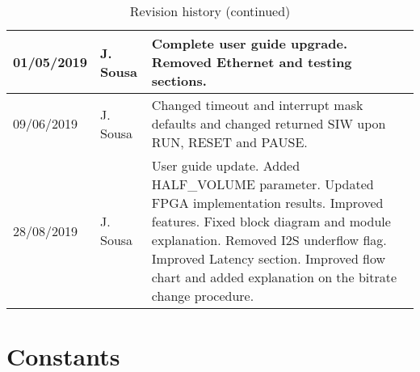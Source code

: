 \documentclass{ug}
\theoremstyle{plain}
\begin{document}
\begin{table}[H]
\begin{center}
\begin{tabular}{|l|l|p{8cm}|}
     01/05/2019 & J. Sousa & Complete user guide upgrade. Removed Ethernet and
     testing sections.\\ \hline

     \rowcolor{iob-blue} 09/06/2019 & J. Sousa & Changed timeout and interrupt
     mask defaults and changed returned SIW upon RUN, RESET and PAUSE.\\ \hline

     28/08/2019 & J. Sousa & User guide update. Added HALF\_VOLUME
     parameter. Updated FPGA implementation results. Improved features. Fixed
     block diagram and module explanation. Removed I2S underflow flag. Improved
     Latency section. Improved flow chart and added explanation on the bitrate
     change procedure.\\ \hline

    \end{tabular}
    \caption{Revision history (continued)}
  \end{center}
\end{table}
\clearpage




\section*{Constants}
\end{document}
